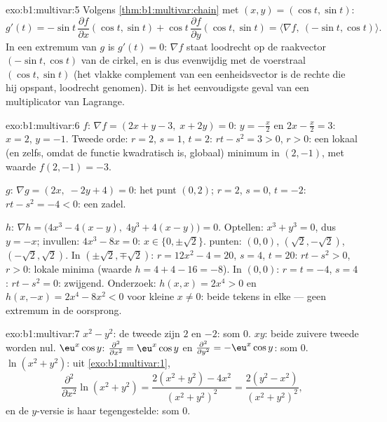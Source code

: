\begin{solution}{exo:b1:multivar:5}
Volgens \cref{thm:b1:multivar:chain} met $(x, y) = (\cos t, \sin
t)$:
\[
g'(t) = -\sin t\,\frac{\partial f}{\partial x}(\cos t, \sin t)
+ \cos t\,\frac{\partial f}{\partial y}(\cos t, \sin t)
= \bigl\langle \nabla f,\ (-\sin t, \cos t)\bigr\rangle .
\]
In een extremum van $g$ is $g'(t) = 0$: $\nabla f$ staat loodrecht
op de raakvector $(-\sin t, \cos t)$ van de cirkel, en is dus
evenwijdig met de voerstraal $(\cos t, \sin t)$ (het vlakke
 complement van een eenheidsvector is de rechte die hij
opspant, loodrecht genomen). Dit is het eenvoudigste geval van een
multiplicator van Lagrange.
\end{solution}

\begin{solution}{exo:b1:multivar:6}
$f$: $\nabla f = (2x + y - 3,\; x + 2y) = 0$: $y = -\frac x2$ en $2x
- \frac x2 = 3$: $x = 2$, $y = -1$. Tweede orde: $r = 2$, $s = 1$,
$t = 2$: $rt - s^2 = 3 > 0$, $r > 0$: een lokaal (en zelfs, omdat de
functie kwadratisch is, globaal) minimum in $(2, -1)$, met waarde
$f(2,-1) = -3$.

$g$: $\nabla g = (2x,\; -2y + 4) = 0$: het punt $(0, 2)$; $r = 2$,
$s = 0$, $t = -2$: $rt - s^2 = -4 < 0$: een zadel.

$h$: $\nabla h = \bigl(4x^3 - 4(x - y),\; 4y^3 + 4(x-y)\bigr) = 0$.
Optellen: $x^3 + y^3 = 0$, dus $y = -x$; invullen: $4x^3 - 8x = 0$:
$x \in \{0, \pm\sqrt2\}$.  punten: $(0,0)$, $(\sqrt2,
-\sqrt2)$, $(-\sqrt2, \sqrt2)$. In $(\pm\sqrt2, \mp\sqrt2)$: $r =
12x^2 - 4 = 20$, $s = 4$, $t = 20$: $rt - s^2 > 0$, $r > 0$: lokale
minima (waarde $h = 4 + 4 - 16 = -8$). In $(0,0)$: $r = t = -4$, $s
= 4$: $rt - s^2 = 0$: zwijgend. Onderzoek: $h(x, x) = 2x^4 > 0$ en
$h(x, -x) = 2x^4 - 8x^2 < 0$ voor kleine $x \neq 0$: beide tekens in
elke  --- geen extremum in de oorsprong.
\end{solution}

\begin{solution}{exo:b1:multivar:7}
$x^2 - y^2$: de tweede  zijn $2$ en $-2$: som
$0$. $xy$: beide zuivere tweede  worden nul.
$\eu^x\cos y$: $\frac{\partial^2}{\partial x^2} = \eu^x\cos y$ en
$\frac{\partial^2}{\partial y^2} = -\eu^x\cos y$: som $0$.
$\ln(x^2+y^2)$: uit \cref{exo:b1:multivar:1},
\[
\frac{\partial^2}{\partial x^2}\ln(x^2+y^2)
= \frac{2(x^2+y^2) - 4x^2}{(x^2+y^2)^2}
= \frac{2(y^2 - x^2)}{(x^2+y^2)^2},
\]
en de $y$-versie is haar tegengestelde: som $0$.
\end{solution}


